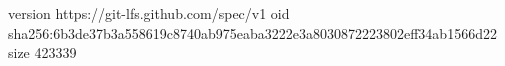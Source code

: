 version https://git-lfs.github.com/spec/v1
oid sha256:6b3de37b3a558619c8740ab975eaba3222e3a8030872223802eff34ab1566d22
size 423339
